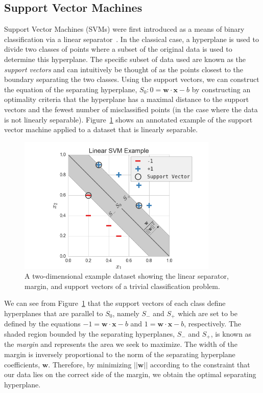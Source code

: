 
\subsection{Support Vector Machines}
\label{sec:svm}

Support Vector Machines (SVMs) were first introduced as a means of binary classification via a linear separator~\cite{VapnikLerner1963}.
%
In the classical case, a hyperplane is used to divide two classes of points where a subset of the original data is used to determine this hyperplane.
%
The specific subset of data used are known as the \emph{support vectors} and can intuitively be thought of as the points closest to the boundary separating the two classes.
%
Using the support vectors, we can construct the equation of the separating hyperplane, $S_0: 0 = \mathbf{w} \cdot \mathbf{x} - b$ by constructing an optimality criteria that the hyperplane has a maximal distance to the support vectors and the fewest number of misclassified points (in the case where the data is not linearly separable).
%
Figure~\ref{fig:svmExample} shows an annotated example of the support vector machine applied to a dataset that is linearly separable.

\begin{figure}[!ht]
  \centering
  \includegraphics[width=0.85\textwidth]{figs/chap3/svmExample}
  \caption[Linear Support Vector Machine Example]{A two-dimensional example dataset showing the linear separator, margin, and support vectors of a trivial classification problem.}
  \label{fig:svmExample}
\end{figure}

We can see from Figure~\ref{fig:svmExample} that the support vectors of each class define hyperplanes that are parallel to $S_0$, namely $S_{-}$ and $S_{+}$ which are set to be defined by the equations $-1 = \mathbf{w} \cdot \mathbf{x} - b$ and $1 = \mathbf{w} \cdot \mathbf{x} - b$, respectively.
%
The shaded region bounded by the separating hyperplanes, $S_{-}$ and $S_{+}$, is known as the \emph{margin} and represents the area we seek to maximize.
%
The width of the margin is inversely proportional to the norm of the separating hyperplane coefficients, $\mathbf{w}$.
%
Therefore, by minimizing $||\mathbf{w}||$ according to the constraint that our data lies on the correct side of the margin, we obtain the optimal separating hyperplane.

